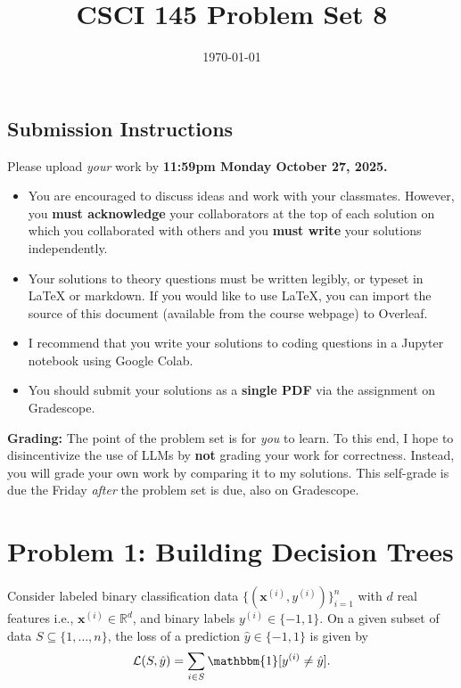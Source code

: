 \documentclass{article}
\title{CSCI 145 Problem Set 8}
\author{} %
\date{\today}
\begin{document}
\maketitle

\subsection*{Submission Instructions}

Please upload \textit{your} work by
\textbf{11:59pm Monday October 27, 2025.}
\begin{itemize}
\item You are encouraged to discuss ideas
and work with your classmates. However, you
\textbf{must acknowledge} your collaborators
at the top of each solution on which
you collaborated with others 
and you \textbf{must write} your solutions
independently.
\item Your solutions to theory questions must
be written legibly, or typeset in LaTeX or markdown.
If you would like to use LaTeX, you can import the source of this document (available from the course webpage) to Overleaf.
\item I recommend that you write your solutions to coding questions in a Jupyter notebook using Google Colab.
\item You should submit your solutions as a \textbf{single PDF} via the assignment on Gradescope.
\end{itemize}

\noindent
\textbf{Grading:} The point of the problem set is for \textit{you} to learn. To this end, I hope to disincentivize the use of LLMs by \textbf{not} grading your work for correctness. Instead, you will grade your own work by comparing it to my solutions. This self-grade is due the Friday \textit{after} the problem set is due, also on Gradescope.

\newpage
\section*{Problem 1: Building Decision Trees}

Consider labeled binary classification data
$\{(\mathbf{x}^{(i)}, y^{(i)})\}_{i=1}^n$ with $d$ real features i.e.,
$\mathbf{x}^{(i)} \in \mathbb{R}^d$, and binary labels $y^{(i)} \in \{-1,1\}$.
On a given subset of data $S \subseteq \{1, \ldots, n\}$, the loss of a prediction $\hat{y} \in \{-1,1\}$ is given by
$$
\mathcal{L}(S, \hat{y}) = \sum_{i \in S} \mathbbm{1}[y^{(i)} \neq \hat{y}].
$$
\end{document}
